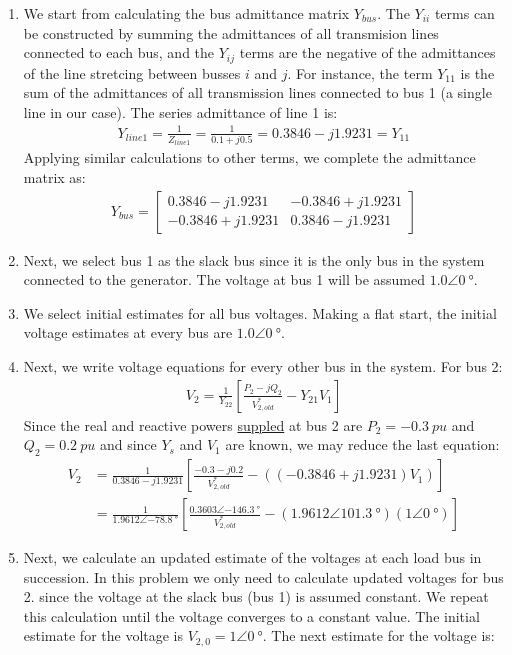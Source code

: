 \begin{enumerate}
	\item We start from calculating the bus admittance matrix $Y_{bus}$. The $Y_{ii}$ terms can be constructed by summing the admittances of all transmision lines connected to each bus, and the $Y_{ij}$ terms are the negative of the admittances of the line stretcing between busses $i$ and $j$. For instance, the term $Y_{11}$ is the sum of the admittances of all transmission lines connected to bus 1 (a single line in our case). The series admittance of line 1 is:
	\begin{gather}
		Y_{line1} = \frac{1}{Z_{line1}}= \frac{1}{0.1+j0.5} = 0.3846-j1.9231=Y_{11}
	\end{gather}
	Applying similar calculations to other terms, we complete the admittance matrix as:
	\begin{gather}
		Y_{bus} = \begin{bmatrix}
			0.3846-j1.9231 & -0.3846+j1.9231\\
			-0.3846+j1.9231 & 0.3846-j1.9231
		\end{bmatrix}
	\end{gather}
	\item Next, we select bus 1 as the slack bus since it is the only bus in the system connected to the generator. The voltage at bus 1 will be assumed $1.0\angle\SI{0}{\degree}$. 
	\item We select initial estimates for all bus voltages. Making a flat start, the initial voltage estimates at every bus are $1.0\angle\SI{0}{\degree}$. 
	\item Next, we write voltage equations for every other bus in the system. For bus 2:
	\begin{gather}
		V_2 = \frac{1}{Y_{22}}\left[ \frac{P_2-jQ_2}{V^*_{2,old}}-Y_{21}V_1 \right]
	\end{gather}
	Since the real and reactive powers \underline{suppled} at bus 2 are $P_2 = \SI{-0.3}{pu}$ and $Q_2 = \SI{0.2}{pu}$ and since $Y_s$ and $V_1$ are known, we may reduce the last equation:
	\begin{align}
		V_2 &= \frac{1}{0.3846 - j1.9231}\left[\frac{-0.3-j0.2}{V^*_{2,old}}-\left(\left(-0.3846+j1.9231\right)V_1\right)\right]\\
		&= \frac{1}{1.9612\angle\SI{-78.8}{\degree}}\left[\frac{0.3603\angle\SI{-146.3}{\degree}}{V^*_{2,old}}-\left(1.9612\angle\SI{101.3}{\degree}\right)\left(1\angle\SI{0}{\degree}\right)\right]
	\end{align}
	\item Next, we calculate an updated estimate of the voltages at each load bus in succession. In this problem we only need to calculate updated voltages for bus 2. since the voltage at the slack bus (bus 1) is assumed constant. We repeat this calculation until the voltage converges to a constant value. The initial estimate for the voltage is $V_{2,0} = 1\angle\SI{0}{\degree}$. The next estimate for the voltage is:

\end{enumerate}
